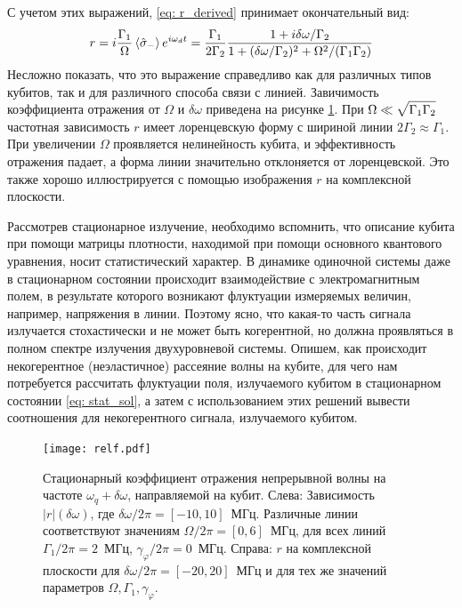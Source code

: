 С учетом этих выражений, \eqref{eq: r_derived} принимает окончательный вид:
\begin{equation}
r = i\frac{\Gamma_1}{\Omega}\braket{\hat{\sigma}_-}e^{i\omega_d t} = \frac{\Gamma_1}{2\Gamma_2}\frac{1+i\delta\omega/\Gamma_2}{1+(\delta\omega/\Gamma_2)^2+\Omega^2/(\Gamma_1\Gamma_2)}
\label{eq: refl}
\end{equation}
Несложно показать, что это выражение справедливо как для различных типов кубитов, так и для различного способа связи с линией. Завичимость коэффициента отражения от $\Omega$ и $\delta\omega$ приведена на рисунке \ref{fig: refl}. При $\Omega\ll\sqrt{\Gamma_1\Gamma_2\vphantom{^2}}$ частотная зависимость $r$ имеет лоренцевскую форму с шириной линии $2\Gamma_2\approx\Gamma_1$. При увеличении $\Omega$ проявляется нелинейность кубита, и эффективность отражения падает, а форма линии значительно отклоняется от лоренцевской. Это также хорошо иллюстрируется с помощью изображения $r$ на комплексной плоскости. 

Рассмотрев стационарное излучение, необходимо вспомнить, что описание кубита при помощи матрицы плотности, находимой при помощи основного квантового уравнения, носит статистический характер. В динамике одиночной системы даже в стационарном состоянии происходит взаимодействие с электромагнитным полем, в результате которого возникают флуктуации измеряемых величин, например, напряжения в линии. Поэтому ясно, что какая-то часть сигнала излучается стохастически и не может быть когерентной, но должна проявляться в полном спектре излучения двухуровневой системы. Опишем, как происходит некогерентное (неэластичное) рассеяние волны на кубите, для чего нам потребуется рассчитать флуктуации поля, излучаемого кубитом в стационарном состоянии \eqref{eq: stat_sol}, а затем с использованием этих решений вывести соотношения для некогерентного сигнала, излучаемого кубитом.
\begin{figure}[ht]
	\centering
	\texttt{[image: relf.pdf]}
	\caption[Коэффициент отражения в стационарном состоянии]{Стационарный коэффициент отражения непрерывной волны на частоте $\omega_q+\delta\omega$, направляемой на кубит. Слева: Зависимость $|r|(\delta\omega)$, где $\delta\omega/2\pi=[-10,10]$~МГц. Различные линии соответствуют значениям $\Omega/2\pi=[0,6]$~МГц, для всех линий $\Gamma_1/2\pi=2$~МГц, $\gamma_\varphi/2\pi=0$~МГц. Справа: $r$ на комплексной плоскости для $\delta\omega/2\pi=[-20,20]$~МГц и для тех же значений параметров $\Omega,\Gamma_1,\gamma_\varphi$.  }
	\label{fig: refl}
\end{figure}
